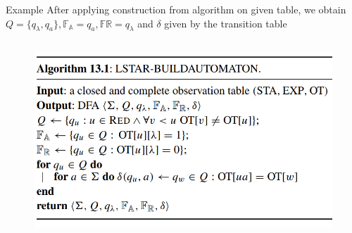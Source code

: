 \documentclass[aspectratio=169,xcolor=dvipsnames]{beamer}
\begin{document}
\begin{frame}[t]{Example}
After applying construction from algorithm on given table, we obtain $Q = \{q_\lambda, q_a\}, \mathds{F}_{\mathds{A}} = {q_a}, \mathds{F\mathds{R}} = {q_\lambda}$ and $\delta$ given by the transition table

\begin{columns}
    \begin{figure}
        \centering
        \includegraphics[width=1\linewidth]{images/alg13_1_small.png}
    \end{figure}


\end{columns}
\end{frame}
\end{document}
